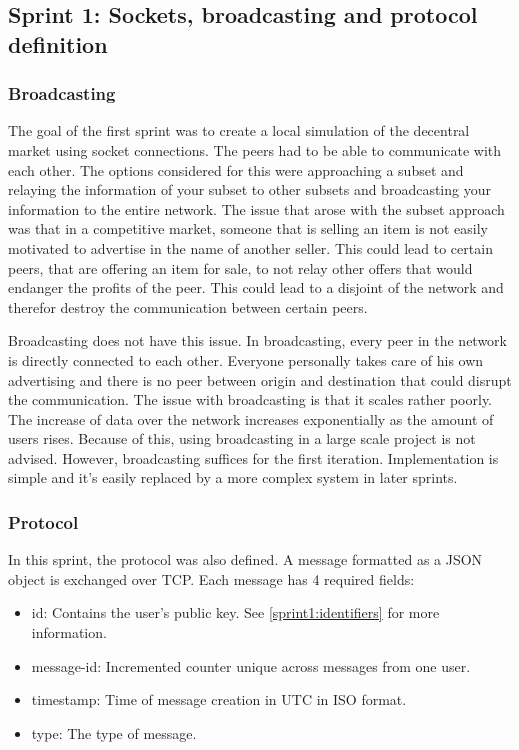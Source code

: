 \documentclass[]{article}
\newenvironment{myitemize}
{ \begin{itemize}
    \setlength{\itemsep}{0pt}
    \setlength{\parskip}{0pt}
    \setlength{\parsep}{0pt}     }
{ \end{itemize}                  }
\begin{document}
\subsection{Sprint 1: Sockets, broadcasting and protocol definition}
\label{sprint1}
\subsubsection{Broadcasting}
The goal of the first sprint was to create a local simulation of the decentral market using socket connections.
The peers had to be able to communicate with each other.
The options considered for this were approaching a subset and relaying the information of your subset to other subsets and broadcasting your information to the entire network.
The issue that arose with the subset approach was that in a competitive market, someone that is selling an item is not easily motivated to advertise in the name of another seller.
This could lead to certain peers, that are offering an item for sale, to not relay other offers that would endanger the profits of the peer.
This could lead to a disjoint of the network and therefor destroy the communication between certain peers.

Broadcasting does not have this issue.
In broadcasting, every peer in the network is directly connected to each other.
Everyone personally takes care of his own advertising and there is no peer between origin and destination that could disrupt the communication.
The issue with broadcasting is that it scales rather poorly.
The increase of data over the network increases exponentially as the amount of users rises.
Because of this, using broadcasting in a large scale project is not advised.
However, broadcasting suffices for the first iteration.
Implementation is simple and it's easily replaced by a more complex system in later sprints.

\subsubsection{Protocol}

In this sprint, the protocol was also defined.
A message formatted as a JSON object is exchanged over TCP.
Each message has 4 required fields:
\begin{myitemize}
\item id: Contains the user's public key. See \ref{sprint1:identifiers} for more information.
\item message-id: Incremented counter unique across messages from one user.
\item timestamp: Time of message creation in UTC in ISO format.
\item type: The type of message.
\end{myitemize}
\end{document}
